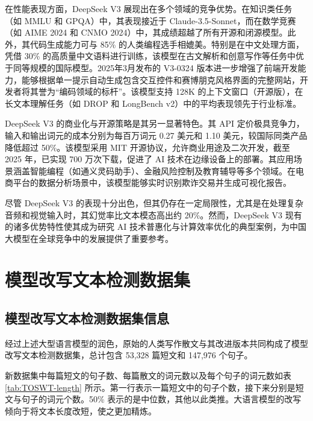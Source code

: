 在性能表现方面，DeepSeek V3 展现出在多个领域的竞争优势。在知识类任务（如 MMLU 和 GPQA）中，其表现接近于 Claude-3.5-Sonnet，而在数学竞赛（如 AIME 2024 和 CNMO 2024）中，其成绩超越了所有开源和闭源模型。此外，其代码生成能力可与 85\% 的人类编程选手相媲美。特别是在中文处理方面，凭借 30\% 的高质量中文语料进行训练，该模型在古文解析和创意写作等任务中优于同等规模的国际模型。2025年3月发布的 V3-0324 版本进一步增强了前端开发能力，能够根据单一提示自动生成包含交互控件和赛博朋克风格界面的完整网站，开发者将其誉为“编码领域的标杆”。该模型支持 128K 的上下文窗口（开源版），在长文本理解任务（如 DROP 和 LongBench v2）中的平均表现领先于行业标准。

DeepSeek V3 的商业化与开源策略是其另一显著特色。其 API 定价极具竞争力，输入和输出词元的成本分别为每百万词元 0.27 美元和 1.10 美元，较国际同类产品降低超过 50\%。该模型采用 MIT 开源协议，允许商业用途及二次开发，截至 2025 年，已实现 700 万次下载，促进了 AI 技术在边缘设备上的部署。其应用场景涵盖智能编程（如通义灵码助手）、金融风险控制及教育辅导等多个领域。在电商平台的数据分析场景中，该模型能够实时识别欺诈交易并生成可视化报告。

尽管 DeepSeek V3 的表现十分出色，但其仍存在一定局限性，尤其是在处理复杂音频和视觉输入时，其幻觉率比文本模态高出约 20\%。然而，DeepSeek V3 现有的诸多优势特性使其成为研究 AI 技术普惠化与计算效率优化的典型案例，为中国大模型在全球竞争中的发展提供了重要参考。

\section{模型改写文本检测数据集}
\label{sec:TOSWT-info}

\subsection{模型改写文本检测数据集信息}

经过上述大型语言模型的润色，原始的人类写作散文与其改进版本共同构成了模型改写文本检测数据集，总计包含 53,328 篇短文和 147,976 个句子。

新数据集中每篇短文的句子数、每篇散文的词元数以及每个句子的词元数如表 \ref{tab:TOSWT-length} 所示。第一行表示一篇短文中的句子个数，接下来分别是短文与句子的词元个数。50\% 表示的是中位数，其他以此类推。大语言模型的改写倾向于将文本长度改短，使之更加精炼。

